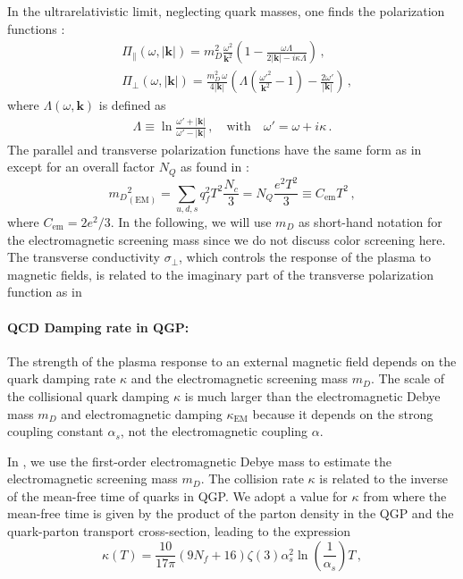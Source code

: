 In the ultrarelativistic limit, neglecting quark masses, one finds the polarization functions \cite{Formanek:2021blc}:
\begin{align}\label{eq:polfuncsUltra}
&\Pi_{\parallel}(\omega,|\boldsymbol{k}|) = m_D^2\frac{\omega^2}{\boldsymbol{k}^2}\left(1 - \frac{\omega \Lambda}{2|\boldsymbol{k}|-i\kappa \Lambda}\right)\,,\\
&\Pi_{\perp}(\omega,|\boldsymbol{k}|) = \frac{m_D^2\,\omega}{4 |\boldsymbol{k}|}\left( \Lambda \left(\frac{\omega'^2}{\boldsymbol{k}^2} - 1\right) - \frac{2\omega'}{ |\boldsymbol{k}|}\right)\,,
\end{align}
where $\Lambda(\omega,\boldsymbol{k})$ is defined as
\begin{align}\label{eq:definitions}
 \Lambda \equiv \ln \frac{\omega'+  |\boldsymbol{k}|}{\omega'- |\boldsymbol{k}|}\,, \quad \text{with} \quad \omega' = \omega+i\kappa\,.
\end{align}
The parallel and transverse polarization functions have the same form as in \cite{Formanek:2021blc} except for an overall factor $N_Q$  as found in \cite{Kapusta:1992fm,Grayson:2022asf}:
\begin{equation}\label{eq:DebyemQCD}
    {m_D}^2_{(\text{EM})} = \sum_{u,d,s} q^2_f T^2 \frac{N_c}{3} = N_Q\frac{e^2T^2}{3} \equiv C_{\text{em}}T^2\,,
\end{equation}
where $C_{\text{em}} =  2e^2/3$. In the following, we will use $m_D$ as short-hand notation for the electromagnetic screening mass since we do not discuss color screening here.
The transverse conductivity $\sigma_{\perp}$, which controls the response of the plasma to magnetic fields, is related to the imaginary part of the transverse polarization function as in 

\paragraph{QCD Damping rate in QGP:} The strength of the plasma response to an external magnetic field depends on the quark damping rate $\kappa$ and the electromagnetic screening mass $m_D$. The scale of the collisional quark damping $\kappa$ is much larger than the electromagnetic Debye mass $m_D$ and electromagnetic damping $\kappa_{\text{EM}}$ because it depends on the strong coupling constant $\alpha_s$, not the electromagnetic coupling $\alpha$.

In \cite{Grayson:2022asf}, we use the first-order electromagnetic Debye mass  to estimate the electromagnetic screening mass $m_D$. The collision rate $\kappa$ is related to the inverse of the mean-free time of quarks in QGP. We adopt a value for $\kappa$ from \cite{Mrowczynski:1988xu} where the mean-free time is given by the product of the parton density in the QGP and the quark-parton transport cross-section, leading to the expression 
\begin{equation}\label{eq:kappadef}
    \kappa(T) = \frac{10}{17\pi} (9 N_f +16) \zeta(3) \alpha_s^2 \ln\left(\frac{1}{\alpha_s}\right) T\,,
\end{equation}

